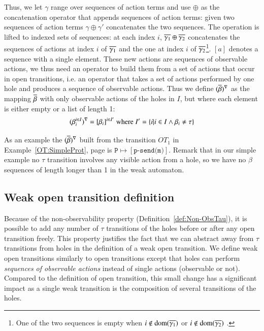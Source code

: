 \documentclass{elsarticle}
\newcommand{\TODO}[1]{\textcolor{red}{\textbf{[TODO:#1]}}}
\begin{document}
Thus, we let $\gamma$ range over sequences of action terms and use $\oplus$ as the concatenation operator that appends sequences of action terms: given two sequences of action terms  $\gamma\oplus\gamma'$ concatenates the two sequences. The operation is lifted to indexed sets of sequences:   at each index $i$, $\overline{\gamma_1}\oplus \overline{\gamma_2}$ concatenates the sequences of actions at index $i$ of $\overline{\gamma_1}$ and the one at index $i$ of $\overline{\gamma_2}$\footnote{One of the two sequences is empty when $i\not \in \operatorname{dom}(\overline{\gamma_1})$ or $i\not \in \operatorname{dom}(\overline{\gamma_2})$ .}. $[a]$ denotes a sequence with a single element.
These new actions are sequences of observable actions, we thus need an operator to build them from a set of actions that occur in open transitions, i.e. an operator that takes a set of actions performed by one hole and produces a sequence of observable actions.
Thus we define $(\overline{\beta})^{\nabla}$ as the mapping $\overline{\beta}$  with only observable actions of the holes in $I$, but where each element is either empty or a list of length 1:
 \[(\beta_i^{i\in I})^{\nabla} = [\beta_i]^{i\in I'}\text{ where }I'=\left\{i| i\in I \land \beta_i\neq \tau\right\}\]

As an example the $(\overline{\beta})^{\nabla}$ built from the transition $OT_1$ in Example~\ref{OT:SimpleProt}, page \pageref{OT:SimpleProt} is $\texttt{P}\mapsto [\texttt{p-send(m)}]$. Remark that in our simple example no $\tau$ transition involves any visible action from a hole, so we have no $\beta$ sequences of length longer than 1 in the weak automaton.

\subsection{Weak open transition definition}

Because of the non-observability property (Definition~\ref{def:Non-ObsTau}), it is possible to add any number of $\tau$ transitions of the holes before or after any open transition freely. This property justifies the fact that we can abstract away from $\tau$ transitions from holes in the definition of a weak open transition.
We define weak open transitions similarly to open transitions except that holes can perform \emph{sequences of observable actions} instead of single actions (observable or not). Compared to the definition of open transition, this small change has a significant impact as a single weak transition is the composition of several transitions of the holes.
\end{document}
